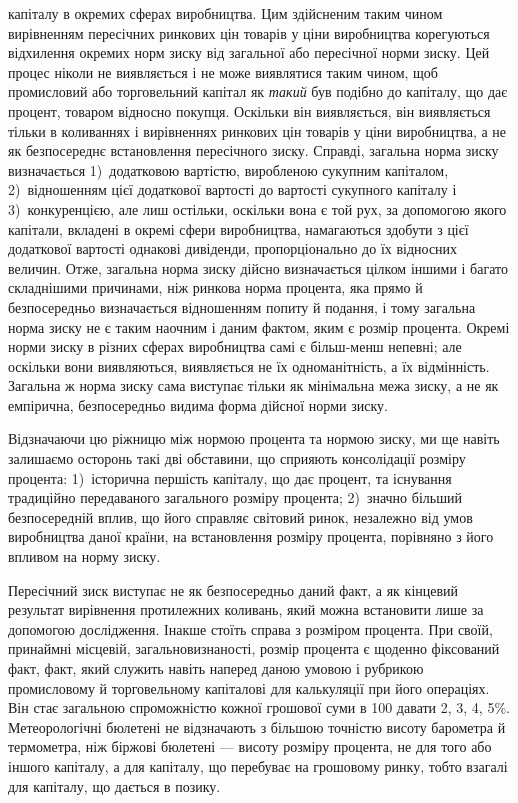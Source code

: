 \parcont{}  %
капіталу в окремих сферах виробництва. Цим здійсненим таким
чином вирівненням пересічних ринкових цін товарів у ціни виробництва
корегуються відхилення окремих норм зиску від загальної
або пересічної норми зиску. Цей процес ніколи не
виявляється і не може виявлятися таким чином, щоб промисловий
або торговельний капітал як \emph{такий} був подібно до капіталу,
що дає процент, товаром відносно покупця. Оскільки він
виявляється, він виявляється тільки в коливаннях і вирівненнях
ринкових цін товарів у ціни виробництва, а не як безпосереднє
встановлення пересічного зиску. Справді, загальна норма зиску
визначається 1)~додатковою вартістю, виробленою сукупним
капіталом, 2)~відношенням цієї додаткової вартості до вартості
сукупного капіталу і 3)~конкуренцією, але лиш остільки,
оскільки вона є той рух, за допомогою якого капітали, вкладені
в окремі сфери виробництва, намагаються здобути з цієї
додаткової вартості однакові дивіденди, пропорціонально до їх
відносних величин. Отже, загальна норма зиску дійсно визначається
цілком іншими і багато складнішими причинами, ніж ринкова
норма процента, яка прямо й безпосередньо визначається
відношенням попиту й подання, і тому загальна норма зиску
не є таким наочним і даним фактом, яким є розмір процента.
Окремі норми зиску в різних сферах виробництва самі є більш-менш
непевні; але оскільки вони виявляються, виявляється не
їх одноманітність, а їх відмінність. Загальна ж норма зиску сама
виступає тільки як мінімальна межа зиску, а не як емпірична,
безпосередньо видима форма дійсної норми зиску.

Відзначаючи цю ріжницю між нормою процента та нормою
зиску, ми ще навіть залишаємо осторонь такі дві обставини, що
сприяють консолідації розміру процента: 1)~історична першість
капіталу, що дає процент, та існування традиційно передаваного
загального розміру процента; 2)~значно більший безпосередній
вплив, що його справляє світовий ринок, незалежно від умов
виробництва даної країни, на встановлення розміру процента, порівняно
з його впливом на норму зиску.

Пересічний зиск виступає не як безпосередньо даний факт,
а як кінцевий результат вирівнення протилежних коливань, який
можна встановити лише за допомогою дослідження. Інакше
стоїть справа з розміром процента. При своїй, принаймні місцевій,
загальновизнаності, розмір процента є щоденно фіксований
факт, факт, який служить навіть наперед даною умовою і рубрикою
промисловому й торговельному капіталові для калькуляції
при його операціях. Він стає загальною спроможністю
кожної грошової суми в 100 давати 2, 3, 4,
5\%. Метеорологічні бюлетені не відзначають з більшою точністю
висоту барометра й термометра, ніж біржові бюлетені —
висоту розміру процента, не для того або іншого капіталу, а для
капіталу, що перебуває на грошовому ринку, тобто взагалі для
капіталу, що дається в позику.
